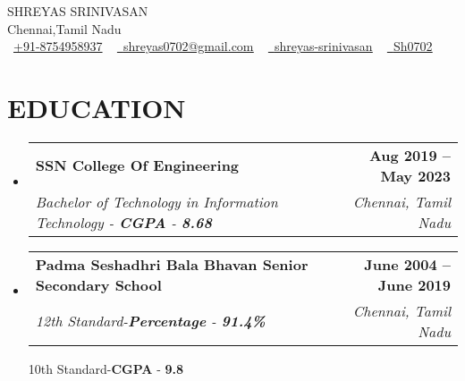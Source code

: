 \documentclass[letterpaper,11pt]{article}
\makeatletter
\newcommand{\resumeSubheading}[4]{
  \vspace{-2pt}\item
    \begin{tabular*}{1.0\textwidth}[t]{l@{\extracolsep{\fill}}r}
      \textbf{\large#1} & \textbf{\small #2} \\
      \textit{\large#3} & \textit{\small #4} \\
      
    \end{tabular*}\vspace{-7pt}
}
\newcommand{\resumeSubHeadingListStart}{\begin{itemize}[leftmargin=0.0in, label={}]}
\newcommand{\resumeSubHeadingListEnd}{\end{itemize}}
\makeatother
\begin{document}


\begin{center}
    {\Huge \scshape SHREYAS SRINIVASAN} \\ \vspace{1pt}
    Chennai,Tamil Nadu \\ \vspace{1pt}
    \small { \raisebox{-0.1\height}\faPhone\ \underline{+91-8754958937} ~} \href{mailto:shreyas0702@gmail.com}{\raisebox{-0.2\height}\faEnvelope\  \underline{shreyas0702@gmail.com}} ~ 
    \href{https://linkedin.com/in/shreyas-srinivasan-1b002b205}{\raisebox{-0.2\height}\faLinkedinSquare\ \underline{shreyas-srinivasan}}  ~
    \href{https://github.com/Sh0702}{\raisebox{-0.2\height}\faGithub\ \underline{Sh0702}} ~
\end{center}


\section{EDUCATION}
  \resumeSubHeadingListStart
    \resumeSubheading
      {SSN College Of Engineering}{Aug 2019 -- May 2023}
      {Bachelor of Technology in Information Technology - \textbf{CGPA} - \textbf{8.68}}{Chennai, Tamil Nadu}
  \resumeSubHeadingListEnd
  
  \resumeSubHeadingListStart
    \resumeSubheading
      {Padma Seshadhri Bala Bhavan Senior Secondary School}{June 2004 -- June 2019}
      {12th Standard-\textbf{Percentage} - \textbf{91.4\%}}{Chennai, Tamil Nadu}
      \linebreak
      {10th Standard-\textbf{CGPA} - \textbf{9.8}}
  \resumeSubHeadingListEnd

\end{document}
